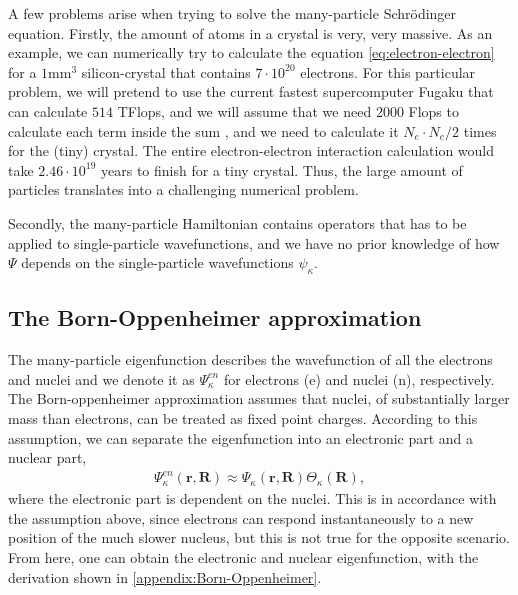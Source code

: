 A few problems arise when trying to solve the many-particle Schrödinger equation. Firstly, the amount of atoms in a crystal is very, very massive. As an example, we can numerically try to calculate the equation \ref{eq:electron-electron} for a $1$mm$^3$ silicon-crystal that contains $7\cdot 10^{20}$ electrons. For this particular problem, we will pretend to use the current fastest supercomputer Fugaku \cite{Top500} that can calculate $514$ TFlops, and we will assume that we need $2000$ Flops to calculate each term inside the sum \cite{Persson2020}, and we need to calculate it $N_e \cdot N_e/2$ times for the (tiny) crystal. The entire electron-electron interaction calculation would take $2.46 \cdot 10^{19}$ years to finish for a tiny crystal. Thus, the large amount of particles translates into a challenging numerical problem.


Secondly, the many-particle Hamiltonian contains operators that has to be applied to single-particle wavefunctions, and we have no prior knowledge of how $\Psi$ depends on the single-particle wavefunctions $\psi_\kappa$.


\subsection{The Born-Oppenheimer approximation}
The many-particle eigenfunction describes the wavefunction of all the electrons and nuclei and we denote it as $\Psi_{\kappa}^{en}$ for electrons (e) and nuclei (n), respectively. The Born-oppenheimer approximation assumes that nuclei, of substantially larger mass than electrons, can be treated as fixed point charges. According to this assumption, we can separate the eigenfunction into an electronic part and a nuclear part,
\begin{align}
  \Psi_\kappa^{en}(\textbf{r}, \textbf{R}) \approx \Psi_{\kappa}(\textbf{r}, \textbf{R})\Theta_{\kappa}(\textbf{R}),
\end{align}
where the electronic part is dependent on the nuclei. This is in accordance with the assumption above, since electrons can respond instantaneously to a new position of the much slower nucleus, but this is not true for the opposite scenario. From here, one can obtain the electronic and nuclear eigenfunction, with the derivation shown in \ref{appendix:Born-Oppenheimer}.


